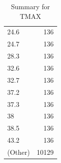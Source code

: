 \begin{table}[ht]
\begin{tabular}{lr}
  24.6 & 136 \\ 
  24.7 & 136 \\ 
  28.3 & 136 \\ 
  32.6 & 136 \\ 
  32.7 & 136 \\ 
  37.2 & 136 \\ 
  37.3 & 136 \\ 
  38 & 136 \\ 
  38.5 & 136 \\ 
  43.2 & 136 \\ 
  (Other) & 10129 \\ 
   \hline
\end{tabular}
\caption{Summary for TMAX} 
\label{tab: TMAX}
\end{table}
